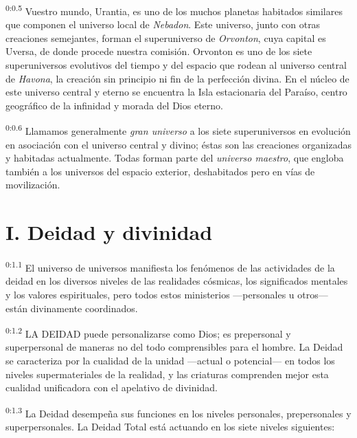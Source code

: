 \par
\textsuperscript{0:0.5} Vuestro mundo, Urantia, es uno de los muchos planetas habitados similares que componen el universo local de \textit{Nebadon}. Este universo, junto con otras creaciones semejantes, forman el superuniverso de \textit{Orvonton}, cuya capital es Uversa, de donde procede nuestra comisión. Orvonton es uno de los siete superuniversos evolutivos del tiempo y del espacio que rodean al universo central de \textit{Havona}, la creación sin principio ni fin de la perfección divina. En el núcleo de este universo central y eterno se encuentra la Isla estacionaria del Paraíso, centro geográfico de la infinidad y morada del Dios eterno.

\par
\textsuperscript{0:0.6} Llamamos generalmente \textit{gran universo} a los siete superuniversos en evolución en asociación con el universo central y divino; éstas son las creaciones organizadas y habitadas actualmente. Todas forman parte del \textit{universo maestro}, que engloba también a los universos del espacio exterior, deshabitados pero en vías de movilización.

\section*{I. Deidad y divinidad}
\par
\textsuperscript{0:1.1} El universo de universos manifiesta los fenómenos de las actividades de la deidad en los diversos niveles de las realidades cósmicas, los significados mentales y los valores espirituales, pero todos estos ministerios ---personales u otros--- están divinamente coordinados.

\par
\textsuperscript{0:1.2} LA DEIDAD puede personalizarse como Dios; es prepersonal y superpersonal de maneras no del todo comprensibles para el hombre. La Deidad se caracteriza por la cualidad de la unidad ---actual o potencial--- en todos los niveles supermateriales de la realidad, y las criaturas comprenden mejor esta cualidad unificadora con el apelativo de divinidad.

\par
\textsuperscript{0:1.3} La Deidad desempeña sus funciones en los niveles personales, prepersonales y superpersonales. La Deidad Total está actuando en los siete niveles siguientes:

